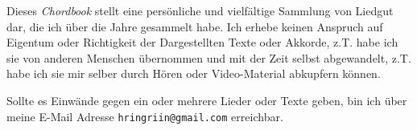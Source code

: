 \documentclass[landscape]{../TeX/Chordbook/chordbook}
\newcommand{\blankpage}{%
    \null
    \thispagestyle{empty}%
    \addtocounter{page}{-1}%
    \newpage}
\newcommand{\wpage}{\afterpage{\blankpage}}
\begin{document}
\date{\textbf{Erstellt am:} 10. Februar 2014 \\ \textbf{\"{U}berarbeitet am:} \today}
\clearpage


\maketitle \clearpage

\begin{center}
    { \Large
        \parbox{17cm}{
            Dieses \textit{Chordbook} stellt eine pers\"{o}nliche und vielf\"{a}ltige Sammlung von Liedgut dar, die ich \"{u}ber die Jahre gesammelt habe.
            Ich erhebe keinen Anspruch auf Eigentum oder Richtigkeit der Dargestellten Texte oder Akkorde, z.T. habe ich sie von anderen Menschen \"{u}bernommen und mit der Zeit selbst abgewandelt, z.T. habe ich sie mir selber durch H\"{o}ren oder Video-Material abkupfern k\"{o}nnen. \par\medskip

            Sollte es Einw\"{a}nde gegen ein oder mehrere Lieder oder Texte geben, bin ich \"{u}ber meine E-Mail Adresse \texttt{hringriin@gmail.com} erreichbar.
        }
    }
\end{center}

\clearpage

\tableofcontents \clearpage

\columnsep=3mm

\renewcommand{\snumbgcolor}{songnr}
\renewcommand{\notebgcolor}{notes}
\renewcommand\printchord[1]{\footnotesize\sffamily\textit{\textcolor{linkcolor}{{#1}}}}


\end{document}
